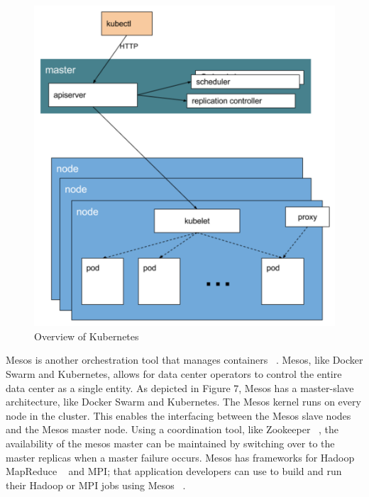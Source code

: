 \documentclass[10pt,twocolumn]{article}
\begin{document}
\begin{figure}[thpb]
  \centering
    \includegraphics[width=\columnwidth]{kubernetes}
    \caption{Overview of Kubernetes ~\cite{platform9_dockerswarm_kubernetes}}
  \label{fig:kubernetes}
\end{figure}

Mesos is another orchestration tool that manages containers ~\cite{mesos}.
Mesos, like Docker Swarm and Kubernetes, allows for data center operators to control the entire data center as a single entity.
As depicted in Figure 7, Mesos has a master-slave architecture, like Docker Swarm and Kubernetes.
The Mesos kernel runs on every node in the cluster.
This enables the interfacing between the Mesos slave nodes and the Mesos master node.
Using a coordination tool, like Zookeeper ~\cite{zookeeper}, the availability of the mesos master can be maintained by switching over to the master replicas when a master failure occurs.
Mesos has frameworks for Hadoop MapReduce ~\cite{mapreduce} and MPI; that application developers can use to build and run their Hadoop or MPI jobs using Mesos ~\cite{mesos}.
\end{document}
